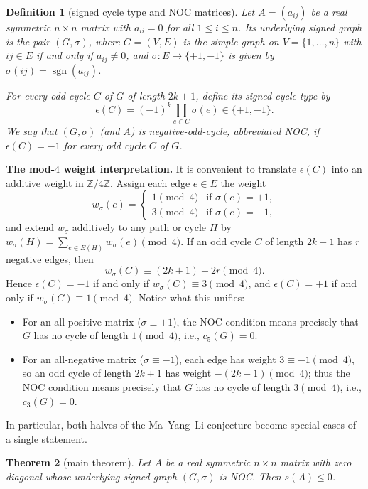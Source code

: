 \documentclass[10pt,letterpaper]{article}
\theoremstyle{zetaplain}
\newtheorem{theorem}{Theorem}[section]
\theoremstyle{zetadef}
\newtheorem{definition}[theorem]{Definition}
\theoremstyle{remark}
\numberwithin{equation}{section}
\DeclareMathOperator{\sgn}{sgn}
\begin{document}
\begin{definition}[signed cycle type and NOC matrices]\label{def:NOC}
Let $A = (a_{ij})$ be a real symmetric $n \times n$ matrix with $a_{ii} = 0$ for all $1 \le i \le n$. Its \emph{underlying signed graph} is the pair $(G, \sigma)$, where $G = (V, E)$ is the simple graph on $V = \{1, \dots, n\}$ with $ij \in E$ if and only if $a_{ij} \ne 0$, and $\sigma : E \to \{+1, -1\}$ is given by $\sigma(ij) = \sgn(a_{ij})$.

For every odd cycle $C$ of $G$ of length $2k+1$, define its \emph{signed cycle type} by
\[
  \epsilon(C) = (-1)^k \prod_{e \in C} \sigma(e) \in \{+1, -1\}.
\]
We say that $(G, \sigma)$ (and $A$) is \emph{negative-odd-cycle}, abbreviated \emph{NOC}, if $\epsilon(C) = -1$ for every odd cycle $C$ of $G$.
\end{definition}

\noindent\textbf{The mod-$4$ weight interpretation.}
It is convenient to translate $\epsilon(C)$ into an additive weight in $\mathbb{Z}/4\mathbb{Z}$. Assign each edge $e \in E$ the weight
\[
  w_\sigma(e) =
  \begin{cases}
    1 \pmod 4 & \text{if } \sigma(e) = +1, \\
    3 \pmod 4 & \text{if } \sigma(e) = -1,
  \end{cases}
\]
and extend $w_\sigma$ additively to any path or cycle $H$ by $w_\sigma(H) = \sum_{e \in E(H)} w_\sigma(e) \pmod 4$. If an odd cycle $C$ of length $2k+1$ has $r$ negative edges, then
\[
  w_\sigma(C) \equiv (2k + 1) + 2r \pmod 4.
\]
Hence $\epsilon(C) = -1$ if and only if $w_\sigma(C) \equiv 3 \pmod 4$, and $\epsilon(C) = +1$ if and only if $w_\sigma(C) \equiv 1 \pmod 4$. Notice what this unifies:
\begin{itemize}
  \item For an all-positive matrix ($\sigma \equiv +1$), the NOC condition means precisely that $G$ has no cycle of length $1 \pmod 4$, i.e., $c_5(G) = 0$.
  \item For an all-negative matrix ($\sigma \equiv -1$), each edge has weight $3 \equiv -1 \pmod 4$, so an odd cycle of length $2k+1$ has weight $-(2k+1) \pmod 4$; thus the NOC condition means precisely that $G$ has no cycle of length $3 \pmod 4$, i.e., $c_3(G) = 0$.
\end{itemize}
In particular, both halves of the Ma--Yang--Li conjecture become special cases of a single statement.

\begin{theorem}[main theorem]\label{thm:main}
Let $A$ be a real symmetric $n \times n$ matrix with zero diagonal whose underlying signed graph $(G, \sigma)$ is NOC. Then $s(A) \le 0$.
\end{theorem}
\end{document}
